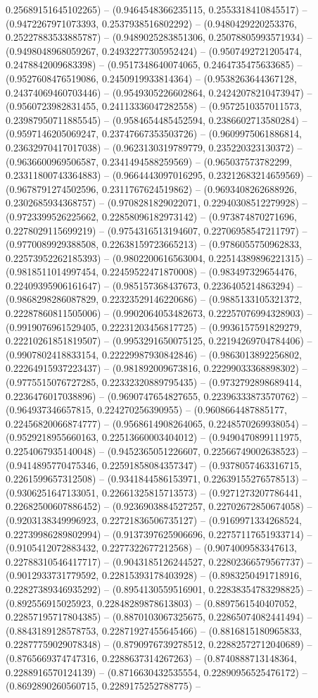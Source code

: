 0.25689151645102265) -- (0.9464548366235115, 0.2553318410845517) -- (0.9472267971073393, 0.2537938516802292) -- (0.9480429220253376, 0.25227883533885787) -- (0.9489025283851306, 0.25078805993571934) -- (0.9498048968059267, 0.24932277305952424) -- (0.9507492721205474, 0.2478842009683398) -- (0.9517348640074065, 0.2464735475633685) -- (0.9527608476519086, 0.2450919933814364) -- (0.9538263644367128, 0.24374069460703446) -- (0.9549305226602864, 0.24242078210473947) -- (0.9560723982831455, 0.24113336047282558) -- (0.9572510357011573, 0.23987950711885545) -- (0.9584654485452594, 0.2386602713580284) -- (0.9597146205069247, 0.23747667353503726) -- (0.9609975061886814, 0.23632970417017038) -- (0.9623130319789779, 0.235220323130372) -- (0.9636600969506587, 0.2341494588259569) -- (0.965037573782299, 0.23311800743364883) -- (0.9664443097016295, 0.23212683214659569) -- (0.9678791274502596, 0.2311767624519862) -- (0.9693408262688926, 0.2302685934368757) -- (0.9708281829022071, 0.22940308512279928) -- (0.9723399526225662, 0.22858096182973142) -- (0.973874870271696, 0.2278029115699219) -- (0.9754316513194607, 0.22706958547211797) -- (0.9770089929388508, 0.22638159723665213) -- (0.9786055750962833, 0.22573952262185393) -- (0.9802200616563004, 0.22514389896221315) -- (0.9818511014997454, 0.22459522471870008) -- (0.983497329654476, 0.22409395906161647) -- (0.985157368437673, 0.2236405214863294) -- (0.9868298286087829, 0.22323529146220686) -- (0.9885133105321372, 0.22287860811505006) -- (0.9902064053482673, 0.22257076994328903) -- (0.9919076961529405, 0.22231203456817725) -- (0.9936157591829279, 0.22210261851819507) -- (0.9953291650075125, 0.22194269704784406) -- (0.9907802418833154, 0.22229987930842846) -- (0.9863013892256802, 0.22264915937223437) -- (0.981892009673816, 0.22299033368898302) -- (0.9775515076727285, 0.22332320889795435) -- (0.9732792898689414, 0.2236476017038896) -- (0.9690747654827655, 0.22396333873570762) -- (0.964937346657815, 0.224270256390955) -- (0.9608664487885177, 0.22456820066874777) -- (0.9568614908264065, 0.2248570269938054) -- (0.9529218955660163, 0.22513660003404012) -- (0.9490470899111975, 0.2254067935140048) -- (0.9452365051226607, 0.22566749002638523) -- (0.9414895770475346, 0.22591858084357347) -- (0.9378057463316715, 0.2261599657312508) -- (0.9341844586153971, 0.22639155276578513) -- (0.9306251647133051, 0.22661325815713573) -- (0.9271273207786441, 0.22682500607886452) -- (0.9236903884527257, 0.22702672850674058) -- (0.9203138349996923, 0.22721836506735127) -- (0.9169971334268524, 0.22739986289802994) -- (0.9137397625906696, 0.22757117651933714) -- (0.9105412072883432, 0.2277322677212568) -- (0.9074009583347613, 0.22788310546417717) -- (0.9043185126244527, 0.22802366579567737) -- (0.9012933731779592, 0.22815393178403928) -- (0.8983250491718916, 0.22827389346935292) -- (0.8954130559516901, 0.22838354783298825) -- (0.892556915025923, 0.22848289878613803) -- (0.8897561540407052, 0.22857195717804385) -- (0.8870103067325675, 0.22865074082441494) -- (0.8843189128578753, 0.22871927455645466) -- (0.8816815180965833, 0.22877759029078348) -- (0.8790976739278512, 0.22882572712040689) -- (0.8765669374747316, 0.2288637314267263) -- (0.8740888713148364, 0.2288916570124139) -- (0.8716630432535554, 0.22890956525476172) -- (0.8692890260560715, 0.2289175252788775) -- 
